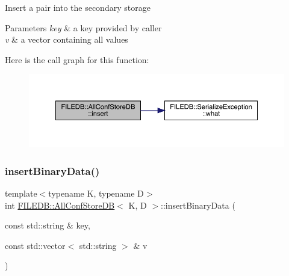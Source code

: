 Insert a pair into the secondary storage 
\begin{DoxyParams}{Parameters}
{\em key} & a key provided by caller \\
\hline
{\em v} & a vector containing all values \\
\hline
\end{DoxyParams}
Here is the call graph for this function\+:
\nopagebreak
\begin{figure}[H]
\begin{center}
\leavevmode
\includegraphics[width=350pt]{df/db6/classFILEDB_1_1AllConfStoreDB_abf4a1ccd7306de436ba1ec61b242e02f_cgraph}
\end{center}
\end{figure}
\mbox{\label{classFILEDB_1_1AllConfStoreDB_ac2c898624d4b32c526951edfb6271d60}} 
\subsubsection{\texorpdfstring{insertBinaryData()}{insertBinaryData()}\hspace{0.1cm}{\footnotesize\ttfamily [1/3]}}
{\footnotesize\ttfamily template$<$typename K, typename D$>$ \\
int \mbox{\hyperlink{classFILEDB_1_1AllConfStoreDB}{F\+I\+L\+E\+D\+B\+::\+All\+Conf\+Store\+DB}}$<$ K, D $>$\+::insert\+Binary\+Data (\begin{DoxyParamCaption}\item[{const std\+::string \&}]{key,  }\item[{const std\+::vector$<$ std\+::string $>$ \&}]{v }\end{DoxyParamCaption})\hspace{0.3cm}{\ttfamily [inline]}}

